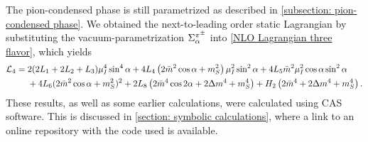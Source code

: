The pion-condensed phase is still parametrized as described in \autoref{subsection: pion-condensed phase}.
We obtained the next-to-leading order static Lagrangian by substituting the vacuum-parametrization $\Sigma^{\pi^\pm}_\alpha$ into \autoref{NLO Lagrangian three flavor}, which yields
%
\begin{align}
    \label{bare static nlo lagrangian}
    \nonumber
    \mathcal{L}_4
    = {}&
    2(2L_1 + 2L_2 + L_3) \mu_I^4 \sin^4\alpha
    + 4  L_4 \left( 2 \bar m^2 \cos\alpha + m_S^2 \right) \mu_I^2\sin^2\alpha
    + 4 L_5 \bar m^2 \mu_I^2 \cos\alpha \sin^2 \alpha 
    \\ & 
    + 4 L_6 (2\bar m^2\cos\alpha + m_S^2)^2
    + 2 L_8 \left(2 \bar m^4 \cos2\alpha + 2 \Delta m^4 + m_S^4\right)
    + H_2 \left(2\bar m^4 + 2\Delta m^4 + m_S^4 \right).
\end{align}
%
These results, as well as some earlier calculations, were calculated using CAS software.
This is discussed in \autoref{section: symbolic calculations}, where a link to an online repository with the code used is available.

